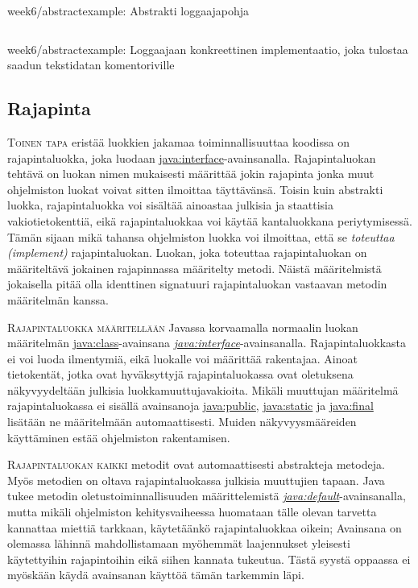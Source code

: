 \documentclass[openany]{book}
\newcommand{\newthought}[1]{\smallskip\textsc{#1}}
\newcommand{\eng}[1]{\textit{(#1)}}
\newcommand{\new}[1]{\textit{\gls{#1}}}
\newcommand{\neweng}[2]{\new{#1} \eng{#2}}
\newcommand{\java}[1]{\underline{\gls{java:#1}}}
\newcommand{\newjava}[1]{\textit{\java{#1}}}
\newcommand{\code}[3]{
	\begin{listing}
		\linespread{0.85}
		\inputminted{java}{OhjelmointiopasEsimerkit/src/#1/#2.java}
		\caption{#1: #3}
		\label{#1/#2}
	\end{listing}
}
\begin{document}
\code{week6/abstractexample}{AbstractLogger}{Abstrakti loggaajapohja}
\code{week6/abstractexample}{CommandLineLogger}{Loggaajaan konkreettinen implementaatio, joka
tulostaa saadun tekstidatan komentoriville}

\subsection{Rajapinta}
\label{interface}

\newthought{Toinen tapa} eristää luokkien jakamaa toiminnallisuuttaa koodissa on rajapintaluokka,
joka luodaan \java{interface}-avainsanalla. Rajapintaluokan tehtävä on luokan nimen mukaisesti
määrittää jokin \gls{rajapinta} jonka muut ohjelmiston luokat voivat sitten ilmoittaa täyttävänsä.
Toisin kuin \gls{abstrakti luokka}, rajapintaluokka voi sisältää ainoastaa julkisia ja staattisia 
vakiotietokenttiä, eikä rajapintaluokkaa voi käytää kantaluokkana periytymisessä. Tämän sijaan
mikä tahansa ohjelmiston luokka voi ilmoittaa, että se \neweng{toteuttaa}{implement}
rajapintaluokan. Luokan, joka toteuttaa rajapintaluokan on määriteltävä jokainen rajapinnassa
määritelty metodi. Näistä määritelmistä jokaisella pitää olla identtinen \gls{signatuuri}
rajapintaluokan vastaavan metodin määritelmän kanssa.

\newthought{Rajapintaluokka määritellään} Javassa korvaamalla normaalin luokan määritelmän 
\java{class}-avainsana \newjava{interface}-avainsanalla. Rajapintaluokkasta ei voi luoda
ilmentymiä, eikä luokalle voi määrittää rakentajaa. Ainoat tietokentät, jotka ovat hyväksyttyjä
rajapintaluokassa ovat oletuksena näkyvyydeltään julkisia luokkamuuttujavakioita. Mikäli muuttujan
määritelmä rajapintaluokassa ei sisällä avainsanoja \java{public}, \java{static} ja \java{final}
lisätään ne määritelmään automaattisesti. Muiden näkyvyysmääreiden käyttäminen estää ohjelmiston
rakentamisen.

\newthought{Rajapintaluokan kaikki} metodit ovat automaattisesti abstrakteja metodeja. Myös
metodien on oltava rajapintaluokassa julkisia muuttujien tapaan. Java tukee metodin
oletustoiminnallisuuden määrittelemistä \newjava{default}-avainsanalla, mutta mikäli ohjelmiston
kehitysvaiheessa huomataan tälle olevan tarvetta kannattaa miettiä tarkkaan, käytetäänkö
rajapintaluokkaa oikein; Avainsana on olemassa lähinnä mahdollistamaan myöhemmät laajennukset
yleisesti käytettyihin rajapintoihin eikä siihen kannata tukeutua. Tästä syystä oppaassa ei
myöskään käydä avainsanan käyttöä tämän tarkemmin läpi.
\end{document}
